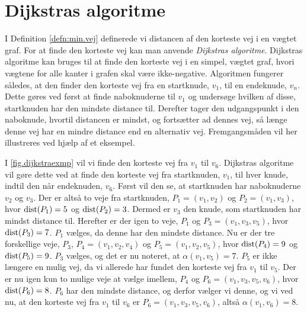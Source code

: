 \section{Dijkstras algoritme} \label{kap:dijkstras}
I Definition \ref{defn:min.vej} definerede vi distancen af den korteste vej i en vægtet graf. For at finde den korteste vej kan man anvende \emph{Dijkstras algoritme}. Dijkstras algoritme kan bruges til at finde den korteste vej i en simpel, vægtet graf, hvori vægtene for alle kanter i grafen skal være ikke-negative. Algoritmen fungerer således, at den finder den korteste vej fra en startknude, $v_{1}$, til en endeknude, $v_{n}$. Dette gøres ved først at finde naboknuderne til $v_{1}$ og undersøge hvilken af disse, startknuden har den mindste distance til. Derefter tager den udgangspunkt i den naboknude, hvortil distancen er mindst, og fortsætter ad dennes vej, så længe denne vej har en mindre distance end en alternativ vej. Fremgangsmåden vil her illustreres ved hjælp af et eksempel.

\begin{exmp} \label{exmp.dijkstae}

I \autoref{fig.dijkstraexmp} vil vi finde den korteste vej fra $v_{1}$ til $v_{6}$. Dijkstras algoritme vil gøre dette ved at finde den korteste vej fra startknuden, $v_{1}$, til hver knude, indtil den når endeknuden, $v_{6}$. Først vil den se, at startknuden har naboknuderne $v_{2}$ og $v_{3}$. Der er altså to veje fra startknuden, $P_1=(v_{1},v_{2})$  og $P_2=(v_{1},v_{3})$, hvor $\textrm{dist}(P_1)=5$ og $\textrm{dist}(P_2)=3$. Dermed er $v_{3}$ den knude, som startknuden har mindst distance til. Herefter er der igen to veje, $P_1$ og $P_3=(v_{1},v_{3},v_{5})$, hvor $\textrm{dist}(P_3)=7$. $P_1$ vælges, da denne har den mindste distance. Nu er der tre forskellige veje, $P_3$, 
$P_4=(v_{1},v_{2}, v_{4})$ og $P_5=(v_{1},v_{2}, v_{5})$, hvor $\textrm{dist}(P_4)=9$ og $\textrm{dist}(P_5)=9$. $P_3$ vælges, og det er nu noteret, at $\alpha(v_{1},v_5)=7$. $P_5$ er ikke længere en mulig vej, da vi allerede har fundet den korteste vej fra $v_{1}$ til $v_{5}$. Der er nu igen kun to mulige veje at vælge imellem, $P_4$ og $P_6=(v_{1},v_{3}, v_{5}, v_{6})$, hvor $\textrm{dist}(P_6)=8$. $P_6$ har den mindste distance, og derfor vælger vi denne, og vi ved nu, at den korteste vej fra $v_{1}$ til $v_{6}$ er $P_6=(v_{1},v_{3}, v_{5}, v_{6})$, altså $\alpha(v_1,v_6)=8$.

\end{exmp}

